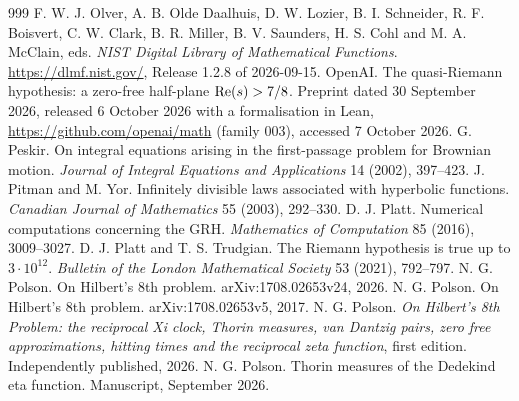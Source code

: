 \begin{thebibliography}{999}
 F. W. J. Olver, A. B. Olde Daalhuis, D. W. Lozier, B. I. Schneider, R. F. Boisvert, C. W. Clark, B. R. Miller, B. V. Saunders, H. S. Cohl and M. A. McClain, eds. \emph{NIST Digital Library of Mathematical Functions}. \url{https://dlmf.nist.gov/}, Release 1.2.8 of 2026-09-15.
 OpenAI. The quasi-Riemann hypothesis: a zero-free half-plane $\operatorname{Re}(s)>7/8$. Preprint dated 30 September 2026, released 6 October 2026 with a formalisation in Lean, \url{https://github.com/openai/math} (family 003), accessed 7 October 2026.
 G. Peskir. On integral equations arising in the first-passage problem for Brownian motion. \emph{Journal of Integral Equations and Applications} 14 (2002), 397--423.
 J. Pitman and M. Yor. Infinitely divisible laws associated with hyperbolic functions. \emph{Canadian Journal of Mathematics} 55 (2003), 292--330.
 D. J. Platt. Numerical computations concerning the GRH. \emph{Mathematics of Computation} 85 (2016), 3009--3027.
 D. J. Platt and T. S. Trudgian. The Riemann hypothesis is true up to $3\cdot10^{12}$. \emph{Bulletin of the London Mathematical Society} 53 (2021), 792--797.
 N. G. Polson. On Hilbert's 8th problem. arXiv:1708.02653v24, 2026.
 N. G. Polson. On Hilbert's 8th problem. arXiv:1708.02653v5, 2017.
 N. G. Polson. \emph{On Hilbert's 8th Problem: the reciprocal Xi clock, Thorin measures, van Dantzig pairs, zero free approximations, hitting times and the reciprocal zeta function}, first edition. Independently published, 2026.
 N. G. Polson. Thorin measures of the Dedekind eta function. Manuscript, September 2026.

\end{thebibliography}
